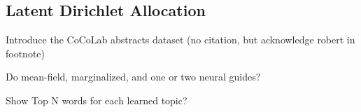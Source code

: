 \subsection{Latent Dirichlet Allocation}
\label{sec:results_lda}

Introduce the CoCoLab abstracts dataset (no citation, but acknowledge robert in footnote)

Do mean-field, marginalized, and one or two neural guides?

Show Top N words for each learned topic?


%
